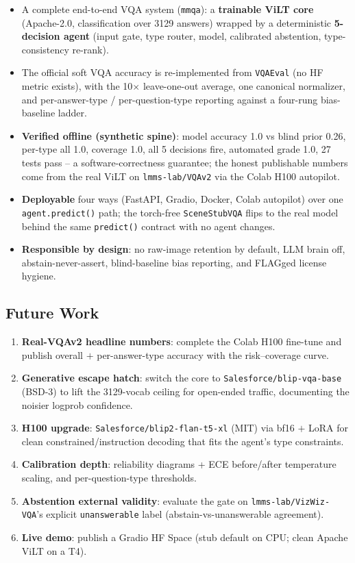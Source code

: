 \documentclass[12pt,a4paper]{article}
\begin{document}
\begin{itemize}\setlength\itemsep{0.15em}
  \item A complete end-to-end VQA system (\texttt{mmqa}): a \textbf{trainable ViLT core} (Apache-2.0, classification over 3129 answers) wrapped by a deterministic \textbf{5-decision agent} (input gate, type router, model, calibrated abstention, type-consistency re-rank).
  \item The official soft VQA accuracy is re-implemented from \texttt{VQAEval} (no HF metric exists), with the 10$\times$ leave-one-out average, one canonical normalizer, and per-answer-type / per-question-type reporting against a four-rung bias-baseline ladder.
  \item \textbf{Verified offline (synthetic spine)}: model accuracy 1.0 vs blind prior 0.26, per-type all 1.0, coverage 1.0, all 5 decisions fire, automated grade 1.0, 27 tests pass -- a software-correctness guarantee; the honest publishable numbers come from the real ViLT on \texttt{lmms-lab/VQAv2} via the Colab H100 autopilot.
  \item \textbf{Deployable} four ways (FastAPI, Gradio, Docker, Colab autopilot) over one \texttt{agent.predict()} path; the torch-free \texttt{SceneStubVQA} flips to the real model behind the same \texttt{predict()} contract with no agent changes.
  \item \textbf{Responsible by design}: no raw-image retention by default, LLM brain off, abstain-never-assert, blind-baseline bias reporting, and FLAGged license hygiene.
\end{itemize}

\subsection{Future Work}

\begin{enumerate}\setlength\itemsep{0.15em}
  \item \textbf{Real-VQAv2 headline numbers}: complete the Colab H100 fine-tune and publish overall $+$ per-answer-type accuracy with the risk--coverage curve.
  \item \textbf{Generative escape hatch}: switch the core to \texttt{Salesforce/blip-vqa-base} (BSD-3) to lift the 3129-vocab ceiling for open-ended traffic, documenting the noisier logprob confidence.
  \item \textbf{H100 upgrade}: \texttt{Salesforce/blip2-flan-t5-xl} (MIT) via bf16 $+$ LoRA for clean constrained/instruction decoding that fits the agent's type constraints.
  \item \textbf{Calibration depth}: reliability diagrams + ECE before/after temperature scaling, and per-question-type thresholds.
  \item \textbf{Abstention external validity}: evaluate the gate on \texttt{lmms-lab/VizWiz-VQA}'s explicit \texttt{unanswerable} label (abstain-vs-unanswerable agreement).
  \item \textbf{Live demo}: publish a Gradio HF Space (stub default on CPU; clean Apache ViLT on a T4).
\end{enumerate}
\end{document}
